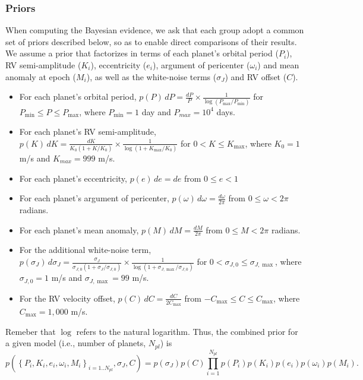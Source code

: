 \documentclass{article}
\begin{document}
\subsubsection{Priors}

When computing the Bayesian evidence, we ask that each group adopt a common set of priors described below, so as to enable direct comparisons of their results.  
We assume a prior that factorizes in terms of each planet's orbital period ($P_i$), RV semi-amplitude ($K_i$), eccentricity ($e_i$), argument of pericenter ($\omega_i$) and mean anomaly at epoch ($M_i$), as well as the white-noise terms ($\sigma_J$) and RV offset ($C$).
%
\begin{itemize}
\item For each planet's orbital period, $p(P) \, dP = \frac{dP}{P} \times  \frac{1}{\log(P_{\max}/P_{\min})}$ for $P_{\min} \le P \le P_{\max}$, where $P_{\min}=1$ day and $P_{max}=10^4$ days.
\item For each planet's RV semi-amplitude, $p(K) \, dK = \frac{dK}{K_0(1+K/K_0)} \times  \frac{1}{\log(1+K_{\max}/K_0)}$ for $0<K\le K_{\max}$, where $K_0=1$ m/s and $K_{max}=999$ m/s.
\item For each planet's eccentricity, $p(e) \, de = de$ from $0 \leq e < 1$
\item For each planet's argument of pericenter, $p(\omega) \, d\omega = \frac{d\omega}{2\pi}$ from $0 \leq \omega < 2\pi$ radians.
\item For each planet's mean anomaly, $p(M) \, dM = \frac{dM}{2\pi}$ from $0 \leq M < 2\pi$ radians.
\item For the additional white-noise term, $p(\sigma_J) \, d\sigma_J = \frac{\sigma_J}{\sigma_{J,0}(1+\sigma_J/\sigma_{J,0})} \times  \frac{1}{\log(1+\sigma_{J,\max}/\sigma_{J,0})}$ for $0<\sigma_{J,0} \le \sigma_{J,\max}$, where $\sigma_{J,0}=1$ m/s and $\sigma_{J,\max}=99$ m/s.
\item For the RV velocity offset, $p(C) \, dC = \frac{dC}{2C_{\max}}$ from $-C_{\max} \le C \le C_{\max}$, where $C_{\max} = 1,000$ m/s.
\end{itemize}
%
Remeber that $\log$ refers to the natural logarithm.
Thus, the combined prior for a given model (i.e., number of planets, $N_{pl}$) is
%
\begin{equation}
p\left(\left\{P_i,K_i,e_i,\omega_i,M_i\right\}_{i=1..N_{pl}}, \sigma_J, C \right) =
p(\sigma_J) p(C) \prod_{i=1}^{N_{pl}} p(P_i) p(K_i) p(e_i) p(\omega_i) p(M_i).
\end{equation}
%
\end{document}
